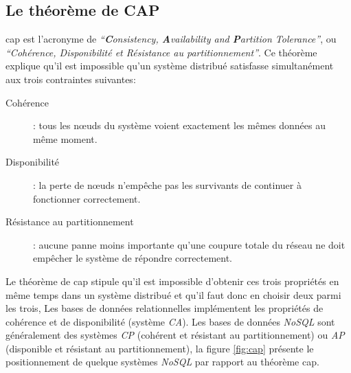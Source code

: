   \subsection{Le théorème de CAP }
  \label{sec:cap}
  \acrshort{cap} \cite{brewer2000towards} est l'acronyme de
  \textit{``\textbf{C}onsistency, \textbf{A}vailability and
    \textbf{P}artition Tolerance''}, ou \textit{``Cohérence,
    Disponibilité et Résistance au partitionnement''}. Ce théorème
  explique qu'il est impossible qu'un système distribué satisfasse
  simultanément aux trois contraintes suivantes:\medskip

  

  \renewcommand{\descriptionlabel}[1]{\hspace{0.5cm}\textbullet~\textsf{#1}}
  \begin{description}
  \item [Cohérence]: tous les nœuds du système voient exactement les
    mêmes données au même moment.

  \item [Disponibilité]: la perte de nœuds n'empêche pas les survivants
    de continuer à fonctionner correctement.

  \item [Résistance au partitionnement]: aucune panne moins importante
    qu'une coupure totale du réseau ne doit empêcher le système de
    répondre correctement.\medskip
  \end{description}
  \enddescription

  Le théorème de \acrshort{cap} stipule qu'il est impossible d'obtenir
  ces trois propriétés en même temps dans un système distribué et
  qu'il faut donc en choisir deux parmi les trois, Les bases de
  données relationnelles implémentent les propriétés de cohérence et
  de disponibilité (système \emph{CA}). Les bases de données
  \emph{NoSQL} sont généralement des systèmes \emph{CP} (cohérent et
  résistant au partitionnement) ou \emph{AP} (disponible et résistant
  au partitionnement), la figure \ref{fig:cap} présente le
  positionnement de quelque systèmes \emph{NoSQL} par rapport au
  théorème \acrshort{cap}.

